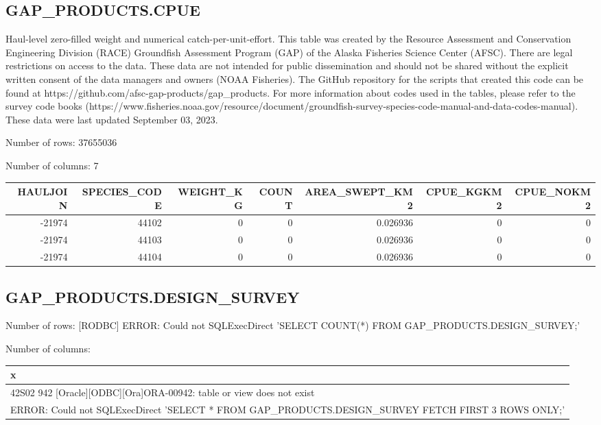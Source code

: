 \documentclass[
  letterpaper,
  oneside,
  open=any]{scrbook}
\begin{document}
\hypertarget{gap_products.cpue-1}{%
\subsection{GAP\_PRODUCTS.CPUE}\label{gap_products.cpue-1}}

Haul-level zero-filled weight and numerical catch-per-unit-effort. This
table was created by the Resource Assessment and Conservation
Engineering Division (RACE) Groundfish Assessment Program (GAP) of the
Alaska Fisheries Science Center (AFSC). There are legal restrictions on
access to the data. These data are not intended for public dissemination
and should not be shared without the explicit written consent of the
data managers and owners (NOAA Fisheries). The GitHub repository for the
scripts that created this code can be found at
https://github.com/afsc-gap-products/gap\_products. For more information
about codes used in the tables, please refer to the survey code books
(https://www.fisheries.noaa.gov/resource/document/groundfish-survey-species-code-manual-and-data-codes-manual).
These data were last updated September 03, 2023.

Number of rows: 37655036

Number of columns: 7

\begin{tabular}{r|r|r|r|r|r|r}
\hline
HAULJOIN & SPECIES\_CODE & WEIGHT\_KG & COUNT & AREA\_SWEPT\_KM2 & CPUE\_KGKM2 & CPUE\_NOKM2\\
\hline
-21974 & 44102 & 0 & 0 & 0.026936 & 0 & 0\\
\hline
-21974 & 44103 & 0 & 0 & 0.026936 & 0 & 0\\
\hline
-21974 & 44104 & 0 & 0 & 0.026936 & 0 & 0\\
\hline
\end{tabular}

\hypertarget{gap_products.design_survey-1}{%
\subsection{GAP\_PRODUCTS.DESIGN\_SURVEY}\label{gap_products.design_survey-1}}

Number of rows: {[}RODBC{]} ERROR: Could not SQLExecDirect 'SELECT
COUNT(*) FROM GAP\_PRODUCTS.DESIGN\_SURVEY;'

Number of columns:

\begin{tabular}{l}
\hline
x\\
\hline
42S02 942 [Oracle][ODBC][Ora]ORA-00942: table or view does not exist\\
\hline
[RODBC] ERROR: Could not SQLExecDirect 'SELECT *
    FROM GAP\_PRODUCTS.DESIGN\_SURVEY
    FETCH FIRST 3 ROWS ONLY;'\\
\hline
\end{tabular}
\end{document}
